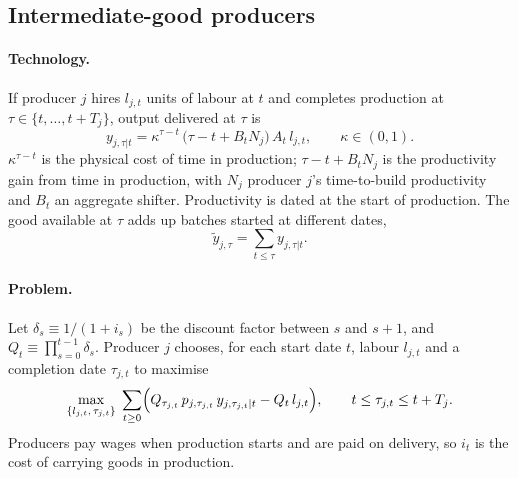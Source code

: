 \documentclass[11pt]{article}
\theoremstyle{definition}
\begin{document}
\subsection{Intermediate-good producers}\label{sec:firms}

\paragraph{Technology.}
If producer $j$ hires $l_{j,t}$ units of labour at $t$ and completes production at
$\tau\in\{t,\dots,t+T_j\}$, output delivered at $\tau$ is
\begin{equation}\label{eq:tech}
  y_{j,\tau|t}=\kappa^{\tau-t}\,\bigl(\tau-t+B_tN_j\bigr)\,A_t\,l_{j,t},\qquad\kappa\in(0,1).
\end{equation}
$\kappa^{\tau-t}$ is the physical cost of time in production; $\tau-t+B_tN_j$ is the productivity gain
from time in production, with $N_j$ producer $j$'s time-to-build productivity and $B_t$ an aggregate
shifter. Productivity is dated at the start of production. The good available at $\tau$ adds up
batches started at different dates,
\begin{equation}\label{eq:vintage}
  \tilde y_{j,\tau}=\sum_{t\le\tau}y_{j,\tau|t} .
\end{equation}

\paragraph{Problem.}
Let $\delta_s\equiv1/(1+i_s)$ be the discount factor between $s$ and $s+1$, and
$Q_t\equiv\prod_{s=0}^{t-1}\delta_s$. Producer $j$ chooses, for each start date $t$, labour
$l_{j,t}$ and a completion date $\tau_{j,t}$ to maximise
\begin{equation}\label{eq:firmprob}
  \max_{\{l_{j,t},\,\tau_{j,t}\}}\;\sum_{t\ge0}\Bigl(Q_{\tau_{j,t}}\,p_{j,\tau_{j,t}}\,y_{j,\tau_{j,t}|t}
     -Q_t\,l_{j,t}\Bigr),
  \qquad t\le\tau_{j,t}\le t+T_j .
\end{equation}
Producers pay wages when production starts and are paid on delivery, so $i_t$ is the cost of
carrying goods in production.
\end{document}
